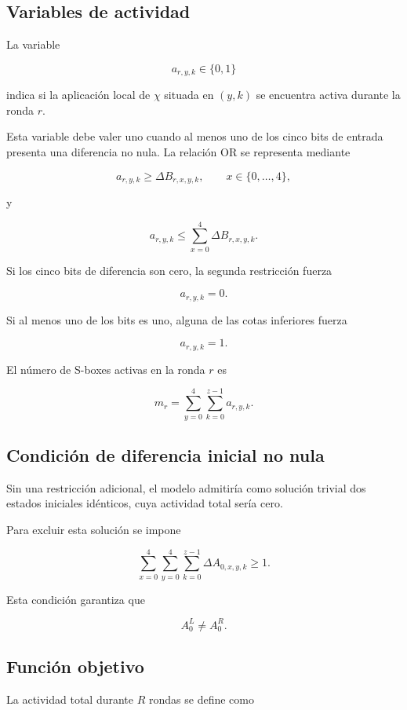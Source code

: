 \subsection{Variables de actividad}
\label{subsec:variables_actividad_milp}

La variable

\[
a_{r,y,k} \in \{0,1\}
\]

indica si la aplicación local de $\chi$ situada en $(y,k)$ se encuentra
activa durante la ronda $r$.

Esta variable debe valer uno cuando al menos uno de los cinco bits de
entrada presenta una diferencia no nula. La relación OR se representa
mediante

\[
a_{r,y,k}
\geq
\Delta B_{r,x,y,k},
\qquad
x\in\{0,\ldots,4\},
\]

y

\[
a_{r,y,k}
\leq
\sum_{x=0}^{4}
\Delta B_{r,x,y,k}.
\]

Si los cinco bits de diferencia son cero, la segunda restricción fuerza

\[
a_{r,y,k}=0.
\]

Si al menos uno de los bits es uno, alguna de las cotas inferiores fuerza

\[
a_{r,y,k}=1.
\]

El número de S-boxes activas en la ronda $r$ es

\[
m_r
=
\sum_{y=0}^{4}
\sum_{k=0}^{z-1}
a_{r,y,k}.
\]


\subsection{Condición de diferencia inicial no nula}
\label{subsec:diferencia_inicial_milp}

Sin una restricción adicional, el modelo admitiría como solución trivial
dos estados iniciales idénticos, cuya actividad total sería cero.

Para excluir esta solución se impone

\[
\sum_{x=0}^{4}
\sum_{y=0}^{4}
\sum_{k=0}^{z-1}
\Delta A_{0,x,y,k}
\geq
1.
\]

Esta condición garantiza que

\[
A_0^L \neq A_0^R.
\]


\subsection{Función objetivo}
\label{subsec:funcion_objetivo_milp}

La actividad total durante $R$ rondas se define como

